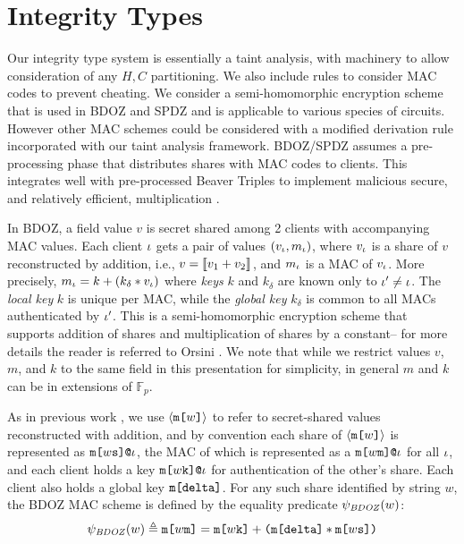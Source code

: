 \section{Integrity Types}
\label{section-ipj}

Our integrity type system is essentially a taint analysis, with
machinery to allow consideration of any $H,C$ partitioning.  We also
include rules to consider MAC codes to prevent cheating. We consider a
semi-homomorphic encryption scheme that is used in BDOZ and SPDZ
\cite{SPDZ1,SPDZ2,BDOZ,10.1007/978-3-030-68869-1_3} and is applicable
to various species of circuits. However other MAC schemes could be
considered with a modified derivation rule incorporated with our taint
analysis framework. BDOZ/SPDZ assumes a pre-processing phase that
distributes shares with MAC codes to clients.  This integrates well
with pre-processed Beaver Triples to implement malicious secure, and
relatively efficient, multiplication \cite{evans2018pragmatic}.

In BDOZ, a field value $v$ is secret shared among 2 clients 
with accompanying MAC values.  Each client $\iota$ gets a pair of
values $(v_\iota,m_\iota)$, where $v_\iota$ is a share of $v$
reconstructed by addition, i.e., $v = \llbracket v_1 + v_2 \rrbracket_{}$, and
$m_\iota$ is a MAC of $v_\iota$.  More precisely, $m_\iota = k +
(k_\delta * v_\iota)$ where \emph{keys} $k$ and $k_\delta$ are known
only to $\iota' \ne \iota$. The \emph{local key} $k$ is
unique per MAC, while the \emph{global key} $k_\delta$ is common to
all MACs authenticated by $\iota'$. This is a semi-homomorphic
encryption scheme that supports addition of shares and multiplication
of shares by a constant-- for more details the reader is referred to
Orsini \cite{10.1007/978-3-030-68869-1_3}. We note that while we
restrict values $v$, $m$, and $k$ to the same field in this
presentation for simplicity, in general $m$ and $k$ can be in
extensions of $\mathbb{F}_p$.

\ipjfig

As in previous work \cite{skalka-near-ppdp24}, we use
$\langle \texttt{m[}w\texttt{]} \rangle$ to refer to secret-shared values reconstructed with
addition, and by convention each share of $\langle \texttt{m[}w\texttt{]} \rangle$ is
represented as $\texttt{m[}w\texttt{s}\texttt{]}\texttt{@}\iota$, the MAC of which is
represented as a $\texttt{m[}w\texttt{m}\texttt{]}\texttt{@}\iota$ for all $\iota$, and
each client holds a key $\texttt{m[}w\texttt{k}\texttt{]}\texttt{@}\iota$ for
authentication of the other's share. Each client also holds a global
key $\texttt{m[}\texttt{delta}\texttt{]}$. For any such share identified by string $w$,
the BDOZ MAC scheme is defined by the equality predicate
$\psi_{\mathit{BDOZ}}(w)$:
$$
\psi_{\mathit{BDOZ}}(w) \triangleq
\texttt{m[}w\texttt{m}\texttt{]} = \texttt{m[}w\texttt{k}\texttt{]} + \texttt{(}\texttt{m[}\texttt{delta}\texttt{]} *
\texttt{m[}w\texttt{s}\texttt{]}\texttt{)}
$$

